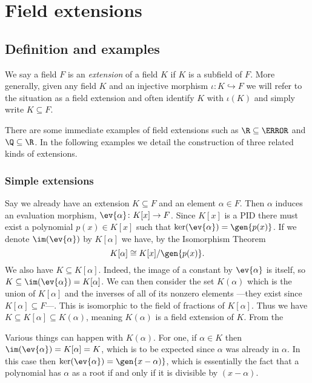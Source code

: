 \documentclass[12pt,oneside]{book}
\begin{document}
\chapter{Field extensions}
\section{Definition and examples}
\begin{definition}
	We say a field \( F \) is an \emph{extension} of a field \( K \) if \( K \) is a
	subfield of \( F \). More generally, given any field \( K \) and an injective morphism
	\( 	\iota \colon K \hookrightarrow F \) we will refer to the situation as a field
	extension and often identify \( K \) with \( \iota(K) \) and simply write \( K \subseteq F \). 
\end{definition}

There are some immediate examples of field extensions such as \( \R \subseteq \C \) and \(
\Q \subseteq \R \). In the following examples we detail the construction of three related
kinds of extensions.

\subsection{Simple extensions}\label{sec:simple extensions}
Say we already have an extension \( K \subseteq F \) and an element \( \alpha \in F \).
Then \( \alpha \) induces an evaluation morphism, \( \ev{\alpha} \colon K[x] \to F \). Since \(
K[x] \) is a PID there must exist a polynomial \( p(x) \in K[x] \) such that \(
\ker(\ev{\alpha}) = \gen{p(x)} \). If we denote \( \im(\ev{\alpha}) \) by \( K[\alpha] \)
we have, by the Isomorphism Theorem
\begin{equation*}
	K[\alpha] \cong K[x]/\gen{p(x)}.
\end{equation*}
We also have \( K \subseteq K[\alpha] \). Indeed, the image of a constant by \(
\ev{\alpha} \) is itself, so \( K \subseteq \im(\ev{\alpha}) = K[\alpha] \). We can then
consider the set \( K(\alpha) \) which is the union of \( K[\alpha] \) and the inverses of
all of its nonzero elements ---they exist since \( K[\alpha] \subseteq F \)---. This is
isomorphic to the field of fractions of \( K[\alpha] \). Thus we have \( K \subseteq K[\alpha]
\subseteq K(\alpha) \), meaning \( K(\alpha) \) is a field extension of \( K \). From the

Various things can happen with \( K(\alpha) \). For one, if \( \alpha \in K \)
then \( \im(\ev{\alpha}) = K[\alpha] = K \), which is to be expected since \( \alpha \)
was already in \( \alpha \). In this case then \( \ker(\ev{\alpha}) = \gen{x - \alpha)}
\), which is essentially the fact that a polynomial has \( \alpha \) as a root if and only
if it is divisible by \( (x - \alpha) \).
\end{document}
